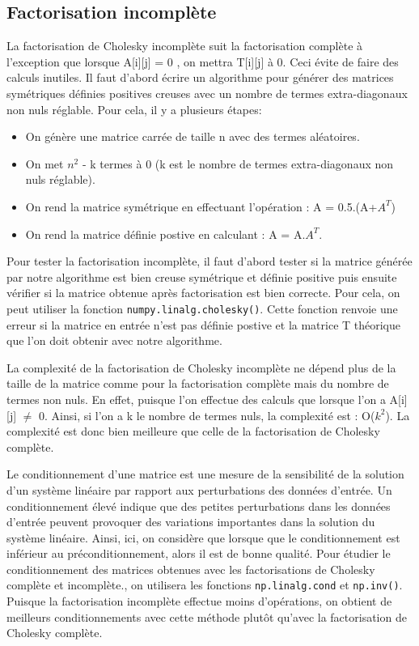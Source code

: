 \documentclass{article}
\begin{document}
\subsection{Factorisation incomplète}
\label{ssec:factor_incompl}
La factorisation de Cholesky incomplète suit la factorisation complète à l'exception que lorsque A[i][j] = 0 , on mettra T[i][j] à 0. Ceci évite de faire des calculs inutiles. 
Il faut d'abord écrire un algorithme pour générer des matrices symétriques définies positives creuses avec un nombre de termes extra-diagonaux non nuls réglable. Pour cela, il y a plusieurs étapes:
\begin{itemize}
    \item On génère une matrice carrée de taille n avec des termes aléatoires.
    \item On met $n^2$ - k termes à 0 (k est le nombre de termes extra-diagonaux non nuls réglable).
    \item On rend la matrice symétrique en effectuant l'opération : A = 0.5.(A+$A^{T}$)
    \item On rend la matrice définie postive en calculant : A = A.$A^{T}$.

\end{itemize}

Pour tester la factorisation incomplète, il faut d'abord tester si la matrice générée par notre algorithme est bien creuse symétrique et définie positive puis ensuite vérifier si la matrice obtenue après factorisation est bien correcte. 
Pour cela, on peut utiliser la fonction \verb|numpy.linalg.cholesky()|. Cette fonction renvoie une erreur si la matrice en entrée n'est pas définie postive et la matrice T théorique que l'on doit obtenir avec notre algorithme.

La complexité de la factorisation de Cholesky incomplète ne dépend plus de la taille de la matrice comme pour la factorisation complète mais du nombre de termes non nuls. En effet, puisque l'on effectue des calculs que lorsque l'on a A[i][j] $\ne$ 0.
Ainsi, si l'on a k le nombre de termes nuls, la complexité est : O($k^2$). La complexité est donc bien meilleure que celle de la factorisation de Cholesky complète.

Le conditionnement d'une matrice est une mesure de la sensibilité de la solution d'un système linéaire par rapport aux perturbations des données d'entrée. Un conditionnement élevé indique que des petites perturbations dans les données d'entrée peuvent provoquer des variations importantes dans la solution du système linéaire.
Ainsi, ici, on considère que lorsque que le conditionnement est inférieur au préconditionnement, alors il est de bonne qualité.
Pour étudier le conditionnement des matrices obtenues avec les factorisations de Cholesky complète et incomplète., on utilisera les fonctions \verb|np.linalg.cond| et \verb|np.inv()|.
Puisque la factorisation incomplète effectue moins d'opérations, on obtient de meilleurs conditionnements avec cette méthode plutôt qu'avec la factorisation de Cholesky complète.
\end{document}
